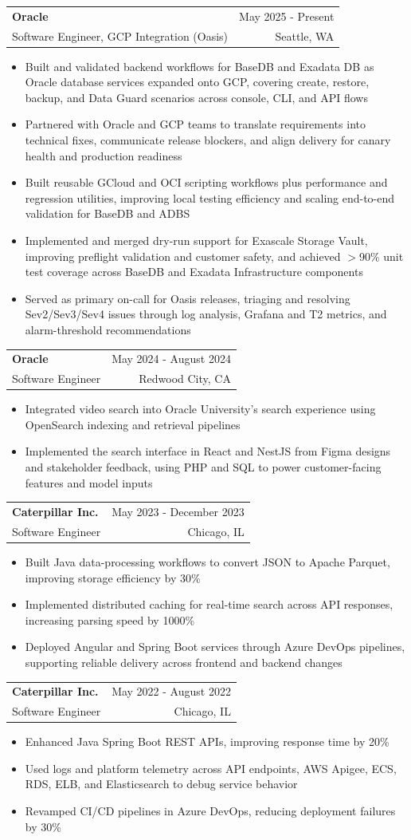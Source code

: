\documentclass[letterpaper,11pt]{article}
\makeatletter
\newcommand{\resumeItem}[1]{
  \item\small{
    {#1 \vspace{-2pt}}
  }
}
\newcommand{\resumeSubheading}[4]{
  \vspace{-2pt}\item
    \begin{tabular*}{0.97\textwidth}[t]{l@{\extracolsep{\fill}}r}
      \textbf{#1} & #2 \\
      {\small#3} & {\small #4} \\
    \end{tabular*}\vspace{-7pt}
}
\newcommand{\resumeItemListStart}{\begin{itemize}}
\newcommand{\resumeItemListEnd}{\end{itemize}\vspace{-5pt}}
\makeatother
\begin{document}
    \resumeSubheading
  {Oracle}{May 2025 - Present}
  {Software Engineer, GCP Integration (Oasis)}{Seattle, WA}
  \resumeItemListStart
    \resumeItem{Built and validated backend workflows for BaseDB and Exadata DB as Oracle database services expanded onto GCP, covering create, restore, backup, and Data Guard scenarios across console, CLI, and API flows}
    \resumeItem{Partnered with Oracle and GCP teams to translate requirements into technical fixes, communicate release blockers, and align delivery for canary health and production readiness}
    \resumeItem{Built reusable GCloud and OCI scripting workflows plus performance and regression utilities, improving local testing efficiency and scaling end-to-end validation for BaseDB and ADBS}
    \resumeItem{Implemented and merged dry-run support for Exascale Storage Vault, improving preflight validation and customer safety, and achieved $>$90\% unit test coverage across BaseDB and Exadata Infrastructure components}
    \resumeItem{Served as primary on-call for Oasis releases, triaging and resolving Sev2/Sev3/Sev4 issues through log analysis, Grafana and T2 metrics, and alarm-threshold recommendations}
  \resumeItemListEnd

    \resumeSubheading
      {Oracle}{May 2024 - August 2024}
      {Software Engineer}{Redwood City, CA}
      \resumeItemListStart
        \resumeItem{Integrated video search into Oracle University's search experience using OpenSearch indexing and retrieval pipelines}
        \resumeItem{Implemented the search interface in React and NestJS from Figma designs and stakeholder feedback, using PHP and SQL to power customer-facing features and model inputs}
      \resumeItemListEnd

    \resumeSubheading
      {Caterpillar Inc.}{May 2023 - December 2023}
      {Software Engineer}{Chicago, IL}
      \resumeItemListStart
        \resumeItem{Built Java data-processing workflows to convert JSON to Apache Parquet, improving storage efficiency by 30\%}
        \resumeItem{Implemented distributed caching for real-time search across API responses, increasing parsing speed by 1000\%}
        \resumeItem{Deployed Angular and Spring Boot services through Azure DevOps pipelines, supporting reliable delivery across frontend and backend changes}
      \resumeItemListEnd

    \resumeSubheading
      {Caterpillar Inc.}{May 2022 - August 2022}
      {Software Engineer}{Chicago, IL}
      \resumeItemListStart
        \resumeItem{Enhanced Java Spring Boot REST APIs, improving response time by 20\%}
        \resumeItem{Used logs and platform telemetry across API endpoints, AWS Apigee, ECS, RDS, ELB, and Elasticsearch to debug service behavior}
        \resumeItem{Revamped CI/CD pipelines in Azure DevOps, reducing deployment failures by 30\%}
    \resumeItemListEnd
\end{document}
